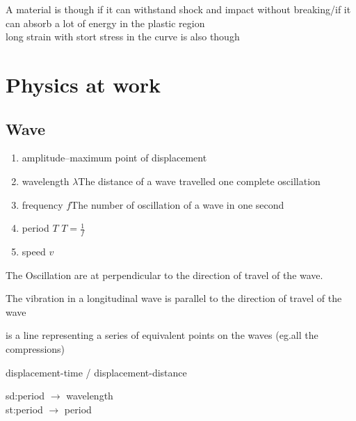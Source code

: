 \documentclass[a4paper]{article}
\begin{document}
\begin{defi}[Toughness]
A material is though if it can withstand shock and impact without breaking/if it can absorb a lot of energy in the plastic region \\

long strain with stort stress in the curve is also though
\end{defi}


\section{Physics at work}
\subsection{Wave}
\begin{defi}
\begin{enumerate}
    \item amplitude--maximum point of displacement
    \item wavelength $\lambda$The distance of a wave travelled one complete oscillation
    \item frequency $f$The number of oscillation of a wave in one second
    \item period $T$  $T=\frac{1}{f}$
    \item speed $v$
\end{enumerate}

\begin{defi}
The Oscillation are at perpendicular to the direction of travel of the wave.
\end{defi}

\begin{defi}
The vibration in a longitudinal wave is parallel to the direction of travel of the wave
\end{defi}

\begin{defi}[wavefront]
is a line representing a series of equivalent points on the waves (eg.all the compressions)
\end{defi}

\begin{defi}
displacement-time / displacement-distance

sd:period $\rightarrow$ wavelength\\
st:period $\rightarrow$ period
\end{defi}

\end{defi}
\end{document}
